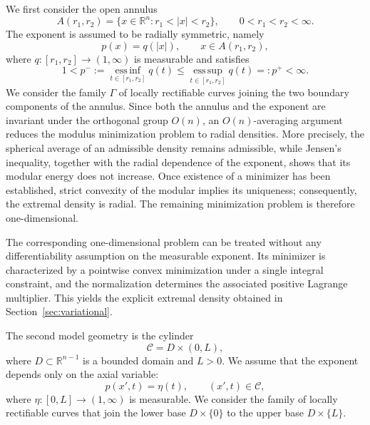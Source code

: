 \documentclass[12pt]{amsart}
\numberwithin{equation}{section}
\theoremstyle{plain}
\theoremstyle{definition}
\begin{document}
We first consider the open annulus
\begin{equation*}
A(r_1,r_2)
=
\{x\in\mathbb{R}^n:r_1<|x|<r_2\},
\qquad
0<r_1<r_2<\infty.
\end{equation*}
The exponent is assumed to be radially symmetric, namely
\begin{equation*}
p(x)=q(|x|),
\qquad x\in A(r_1,r_2),
\end{equation*}
where
$q:[r_1,r_2]\longrightarrow(1,\infty)$
is measurable and satisfies
\begin{equation*}
1<p^-:=
\operatorname*{ess\,inf}_{t\in[r_1,r_2]}q(t)
\le
\operatorname*{ess\,sup}_{t\in[r_1,r_2]}q(t)
=:p^+
<\infty.
\end{equation*}
We consider the family $\Gamma$ of locally rectifiable curves joining
the two boundary components of the annulus. Since both the annulus and
the exponent are invariant under the orthogonal group $O(n)$, an
$O(n)$-averaging argument reduces the modulus minimization problem to
radial densities. More precisely, the spherical average of an
admissible density remains admissible, while Jensen's inequality,
together with the radial dependence of the exponent, shows that its
modular energy does not increase. Once existence of a minimizer has
been established, strict convexity of the modular implies its
uniqueness; consequently, the extremal density is radial. The
remaining minimization problem is therefore one-dimensional.

The corresponding one-dimensional problem can be treated without any
differentiability assumption on the measurable exponent. Its
minimizer is characterized by a pointwise convex minimization under a
single integral constraint, and the normalization determines the
associated positive Lagrange multiplier. This yields the explicit
extremal density obtained in Section~\ref{sec:variational}.

The second model geometry is the cylinder
\begin{equation*}
\mathcal{C}=D\times(0,L),
\end{equation*}
where $D\subset\mathbb{R}^{n-1}$ is a bounded domain and $L>0$. We
assume that the exponent depends only on the axial variable:
\begin{equation*}
p(x',t)=\eta(t),
\qquad
(x',t)\in\mathcal{C},
\end{equation*}
where
$\eta:[0,L]\longrightarrow(1,\infty)$
is measurable.
We consider the family of locally rectifiable curves that join the lower
base $D\times\{0\}$ to the upper base $D\times\{L\}$.
\end{document}
